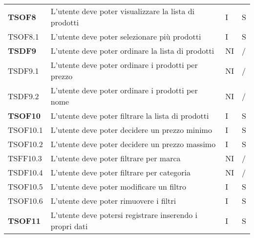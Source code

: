 \begin{center}
\begin{longtable}[!h]{p{60px} p{240px} p{35px} p{35px}}
        \textbf{TSOF8}  & L'utente deve poter visualizzare la lista di prodotti                                               & I              & S              \\
        TSOF8.1         & L'utente deve poter selezionare più prodotti                                                        & I              & S              \\
        \textbf{TSDF9}  & L'utente deve poter ordinare la lista di prodotti                                                   & NI             & /              \\
        TSDF9.1         & L'utente deve poter ordinare i prodotti per prezzo                                                  & NI             & /              \\
        TSDF9.2         & L'utente deve poter ordinare i prodotti per nome                                                    & NI             & /              \\
        \textbf{TSOF10} & L'utente deve poter filtrare la lista di prodotti                                                   & I              & S              \\
        TSOF10.1        & L'utente deve poter decidere un prezzo minimo                                                       & I              & S              \\
        TSOF10.2        & L'utente deve poter decidere un prezzo massimo                                                      & I              & S              \\
        TSFF10.3        & L'utente deve poter filtrare per marca                                                              & NI             & /              \\
        TSDF10.4        & L'utente deve poter filtrare per categoria                                                          & NI             & /              \\
        TSOF10.5        & L'utente deve poter modificare un filtro                                                            & I              & S              \\
        TSOF10.6        & L'utente deve poter rimuovere i filtri                                                              & I              & S              \\
        \textbf{TSOF11} & L'utente deve potersi registrare inserendo i propri dati                                            & I              & S              \\

\end{longtable}
\end{center}
